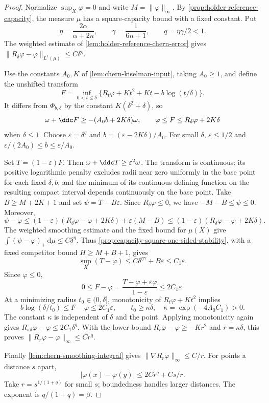 \begin{proof}
Normalize $\sup_X\varphi=0$ and write $M=\|\varphi\|_\infty$. By \cref{prop:holder-reference-capacity}, the measure $\mu$ has a square-capacity bound with a fixed constant. Put
\[
 \eta=\frac{2\alpha}{\alpha+2n},\qquad
 \gamma=\frac1{6n+1},\qquad q=\eta\gamma/2<1.
\]
The weighted estimate of \cref{lem:holder-reference-chern-error} gives $\|R_\delta\varphi-\varphi\|_{L^1(\mu)}\leq C\delta^\eta$.

Use the constants $A_0,K$ of \cref{lem:chern-kiselman-input}, taking $A_0\geq1$, and define the unshifted transform
\[
 F=\inf_{0<t\leq\delta}
       \{R_t\varphi+Kt^2+Kt-b\log(t/\delta)\}.
\]
It differs from $\Phi_{b,\delta}$ by the constant $K(\delta^2+\delta)$, so
\[
 \omega+\ddc F\geq-(A_0b+2K\delta)\omega,
 \qquad \varphi\leq F\leq R_\delta\varphi+2K\delta
\]
when $\delta\leq1$. Choose $\varepsilon=\delta^q$ and $b=(\varepsilon-2K\delta)/A_0$. For small $\delta$, $\varepsilon\leq1/2$ and $\varepsilon/(2A_0)\leq b\leq\varepsilon/A_0$.

Set $T=(1-\varepsilon)F$. Then $\omega+\ddc T\geq\varepsilon^2\omega$. The transform is continuous: its positive logarithmic penalty excludes radii near zero uniformly in the base point for each fixed $\delta,b$, and the minimum of its continuous defining function on the resulting compact interval depends continuously on the base point. Take $B\geq M+2K+1$ and set $\psi=T-B\varepsilon$. Since $R_\delta\varphi\leq0$, we have $-M-B\leq\psi\leq0$. Moreover,
\[
 \psi-\varphi
 \leq(1-\varepsilon)(R_\delta\varphi-\varphi+2K\delta)
                         +\varepsilon(M-B)
 \leq(1-\varepsilon)(R_\delta\varphi-\varphi+2K\delta).
\]
The weighted smoothing estimate and the fixed bound for $\mu(X)$ give $\int(\psi-\varphi)_+\,\mathrm d\mu\leq C\delta^\eta$. Thus \cref{prop:capacity-square-one-sided-stability}, with a fixed competitor bound $H\geq M+B+1$, gives
\[
 \sup_X(T-\varphi)\leq C\delta^{\eta\gamma}+B\varepsilon\leq C_1\varepsilon.
\]
Since $\varphi\leq0$,
\[
 0\leq F-\varphi
 =\frac{T-\varphi+\varepsilon\varphi}{1-\varepsilon}
 \leq2C_1\varepsilon.
\]
At a minimizing radius $t_0\in(0,\delta]$, monotonicity of $R_t\varphi+Kt^2$ implies
\[
 b\log(\delta/t_0)\leq F-\varphi\leq2C_1\varepsilon,
 \qquad t_0\geq\kappa\delta,
 \quad\kappa=\exp(-4A_0C_1)>0.
\]
The constant $\kappa$ is independent of $\delta$ and the point. Applying monotonicity again gives $R_{\kappa\delta}\varphi-\varphi\leq2C_1\delta^q$. With the lower bound $R_r\varphi-\varphi\geq-Kr^2$ and $r=\kappa\delta$, this proves $\|R_r\varphi-\varphi\|_\infty\leq Cr^q$.

Finally \cref{lem:chern-smoothing-integral} gives $\|\nabla R_r\varphi\|_\infty\leq C/r$. For points a distance $s$ apart,
\[
 |\varphi(x)-\varphi(y)|\leq2Cr^q+Cs/r.
\]
Take $r=s^{1/(1+q)}$ for small $s$; boundedness handles larger distances. The exponent is $q/(1+q)=\beta$.
\end{proof}
